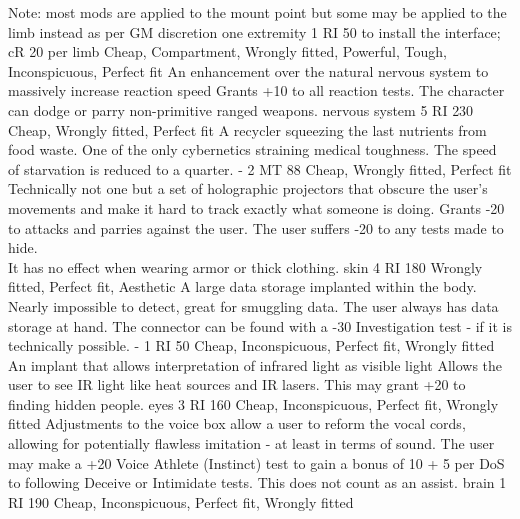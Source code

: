 \begin{multicols}{2}
{	   Note: most mods are applied to the mount point but some may be applied to the limb instead as per GM discretion}
    {one extremity}
    {1 RI}
    {50 to install the interface; cR 20 per limb}
    {Cheap, Compartment, Wrongly fitted, Powerful, Tough, Inconspicuous, Perfect fit}
    {An enhancement over the natural nervous system to massively increase reaction speed}
    {Grants +10 to all reaction tests. The character can dodge or parry non-primitive ranged weapons.}
    {nervous system}
    {5 RI}
    {230}
    {Cheap, Wrongly fitted, Perfect fit}
    {A recycler squeezing the last nutrients from food waste. One of the only cybernetics straining medical toughness.}
    {The speed of starvation is reduced to a quarter.}
    {-}
    {2 MT}
    {88}
    {Cheap, Wrongly fitted, Perfect fit}
    {Technically not one but a set of holographic projectors that obscure the user's movements and make it hard to track exactly what someone is doing.}
    {Grants -20 to attacks and parries against the user.
       The user suffers -20 to any tests made to hide. \\
	   It has no effect when wearing armor or thick clothing.}
    {skin}
    {4 RI}
    {180}
    {Wrongly fitted, Perfect fit, Aesthetic}
    {A large data storage implanted within the body. Nearly impossible to detect, great for smuggling data.}
    {The user always has data storage at hand. The connector can be found with a -30 Investigation test - if it is technically possible.}
    {-}
    {1 RI}
    {50}
    {Cheap, Inconspicuous, Perfect fit, Wrongly fitted}
    {An implant that allows interpretation of infrared light as visible light}
    {Allows the user to see IR light like heat sources and IR lasers.
        This may grant +20 to finding hidden people.}
    {eyes}
    {3 RI}
    {160}
    {Cheap, Inconspicuous, Perfect fit, Wrongly fitted}
    {Adjustments to the voice box allow a user to reform the vocal cords, allowing for potentially flawless imitation - at least in terms of sound.}
    {The user may make a +20 Voice Athlete (Instinct) test to gain a bonus of 10 + 5 per DoS to following Deceive or Intimidate tests. This does not count as an assist.}
    {brain}
    {1 RI}
    {190}
    {Cheap, Inconspicuous, Perfect fit, Wrongly fitted}
\end{multicols}
